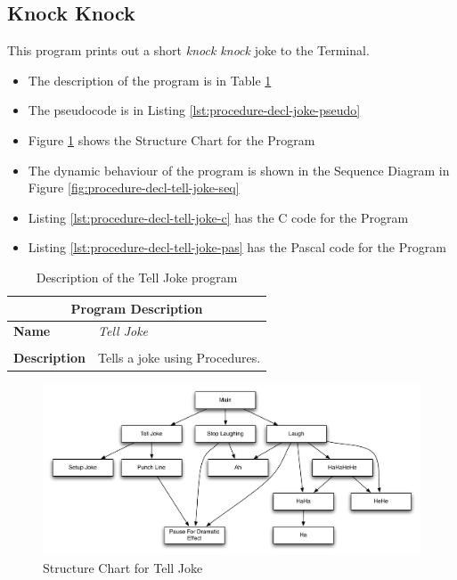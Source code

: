 \subsection{Knock Knock} %
\label{sub:knock_knock}

This program prints out a short \emph{knock knock} joke to the Terminal. 
\begin{itemize}
  \item The description of the program is in Table \ref{tbl:procedure-decl-joke}
  \item The pseudocode is in Listing \ref{lst:procedure-decl-joke-pseudo}
  \item Figure \ref{fig:procedure-decl-tell-joke-struct} shows the Structure Chart for the Program
  \item The dynamic behaviour of the program is shown in the Sequence Diagram in Figure \ref{fig:procedure-decl-tell-joke-seq}
  \item Listing \ref{lst:procedure-decl-tell-joke-c} has the C code for the Program
  \item Listing \ref{lst:procedure-decl-tell-joke-pas} has the Pascal code for the Program
\end{itemize}

\begin{table}[h]
\centering
\begin{tabular}{l|p{10cm}}
  \hline
  \multicolumn{2}{c}{\textbf{Program Description}} \\
  \hline
  \textbf{Name} & \emph{Tell Joke} \\
  \\
  \textbf{Description} & Tells a joke using Procedures. \\
  \hline
\end{tabular}
\caption{Description of the Tell Joke program}
\label{tbl:procedure-decl-joke}
\end{table}

\begin{figure}[h]
   \centering
   \includegraphics[width=\textwidth]{./topics/procedure-decl/images/TellJokeStructure} 
   \caption{Structure Chart for Tell Joke}
   \label{fig:procedure-decl-tell-joke-struct}
\end{figure}

